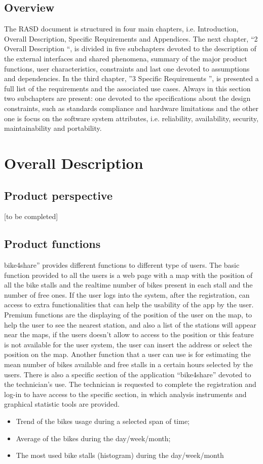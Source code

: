 \documentclass{article}
\begin{document}
\subsection{Overview}
The RASD document is structured in four main chapters, i.e. Introduction, Overall Description, Specific Requirements and Appendices. The next chapter, “2 Overall Description “, is divided in five subchapters devoted to the description of the external interfaces and shared phenomena, summary of the major product functions, user characteristics, constraints and last one devoted to assumptions and dependencies.
In the third chapter, ”3 Specific Requirements ”, is presented a full list of the requirements and the associated use cases. Always in this section two subchapters are present: one devoted to the specifications about the design constraints, such as standards compliance and hardware limitations and the other one is focus on the software system attributes, i.e. reliability, availability, security, maintainability and portability.

\section{Overall Description}
\subsection{Product perspective}
[to be completed]
\subsection{Product functions}
bike4share” provides different functions to different type of users. 
The basic function provided to all the users is a web page with a map with the position of all the bike stalls and the realtime number of bikes present in each stall and the number of free ones.
If the user logs into the system, after the registration, can access to extra functionalities that can help the usability of the app by the user. Premium functions are the displaying of the position of the user on the map, to help the user to see the nearest station, and also a list of the stations will appear near the maps, if the users doesn’t allow to access to the position or this feature is not available for the user system, the user can insert the address or select the position on the map. Another function that a user can use is for estimating the mean number of bikes available and free stalls in a certain hours selected by the users. 
There is also a specific section of the application “bike4share” devoted to the technician’s use. The technician is requested to complete the registration and log-in to have access to the specific section, in which analysis instruments and graphical statistic tools are provided. 
\begin{itemize}
    \item Trend of the bikes usage during a selected span of time;
    \item Average of the bikes during the day/week/month;
    \item The most used bike stalls (histogram) during the day/week/month
\end{itemize}
\end{document}
